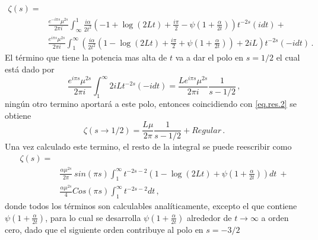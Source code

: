 \begin{align}\label{eq.zeta.logs}
    \zeta  (s) =& \\
     & \frac{e^{-i \pi s} \mu ^{2s}}{2 \pi i} \int _{\infty} ^{1}
     \frac{ i \alpha}{2 t^2}
     \left(
     - 1 +  \log (2 L t) + \frac{i \pi}{2}  - \psi \left( 1+\frac{\alpha}{2 t} \right)
     \right)
     t^{-2 s}
      \nonumber
     (i dt) + \\
     & \frac{e^{i \pi s} \mu ^{2s}}{2 \pi i} \int _1 ^{\infty}
	\left(      
     \frac{ i \alpha}{2  t^2}
     \left(
     1 -  \log (2 L t) + \frac{i \pi}{2} + \psi \left( 1 + \frac{\alpha}{2 t} \right)       
     \right)
     + 2 i L
     \right)
     t^{-2 s}
     (-i dt) \nonumber
     	\, .
\end{align}
El término que tiene la potencia mas alta de $t$ va a dar el polo en $s=1/2$ el cual está dado por
\begin{equation}
    \frac{e^{i \pi s} \mu ^{2s} }{2 \pi i }
    \int _1 ^{\infty}
    2 i L    
    t ^{-2 s}
    (-i dt) =  
    \frac{L e^{i \pi s} \mu ^{2s}}{2 \pi i} \frac{1}{s-1/2   }
    	\, ,
\end{equation}
ningún otro termino aportará a este polo, entonces coincidiendo con \ref{eq.res.2} se obtiene
\begin{equation}
    \zeta (s \rightarrow 1/2) = \frac{L \mu }{2 \pi} \frac{1}{s- 1/2 } + Regular
    	\, .
\end{equation}
Una vez calculado este termino, el resto de la integral se puede reescribir como
\begin{align}
	\zeta (s) =&  
		\nonumber \\[5pt]
    & \frac{\alpha \mu ^{2s} }{2 \pi} \ sin(\pi s)
    \int _1 ^{\infty}
    t ^{-2 s-2} 
    \left(
    1 -  \log (2Lt) + \psi \left( 1 + \frac{\alpha}{2t} \right)
    \right) dt \ + 
    	\nonumber \\[5pt]
    &
    \frac{\alpha \mu ^{2s} }{4} 
    Cos(\pi s)
    \int _1 ^{\infty} t^{-2s-2} dt
    	\, ,
\end{align}
donde todos los términos son calculables analíticamente, excepto el que contiene $\psi \left( 1 + \frac{\alpha}{2t} \right)$, para lo cual se desarrolla $\psi \left( 1 + \frac{\alpha}{2t} \right) $ alrededor de $t \rightarrow \infty$ a orden cero, dado que el siguiente orden contribuye al polo en $s = -3/2$

